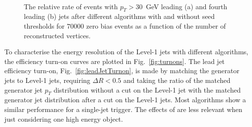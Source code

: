 \begin{figure}
  \centering
  ~ 
  \caption{The relative rate of events with $p_T>30$~GeV leading (a)
  and fourth leading (b) jets after different \PUS algorithms with and
  without seed thresholds for $70 000$ zero bias events as a function
  of the number of reconstructed vertices.}
  \label{fig:ratenvtx}
\end{figure}

To characterise the energy resolution of the Level-1 jets with
different \PUS algorithms, the efficiency turn-on curves are plotted
in Fig.~\ref{fig:turnons}. The lead jet efficiency turn-on,
Fig.~\ref{fig:leadJetTurnon}, is
made by matching the generator jets to Level-1 jets, requiring $\Delta
R<0.5$ and taking the ratio of the matched generator jet $p_T$
distribution without a cut on the Level-1 jet with the matched
generator jet distribution after a cut on the Level-1 jets. Most algorithms
show a similar performance for a single-jet trigger. The effects of
\PU are less relevant when just considering one high energy object.

